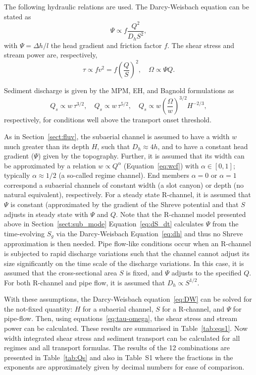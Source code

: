 \documentclass[esurf, manuscript]{copernicus}
\begin{document}
The following hydraulic relations are used.
The Darcy-Weisbach equation can be stated as
\begin{equation}
  \label{eq:DW}
  \Psi \propto f\frac{Q^2}{D_h S^2},
\end{equation}
with $\Psi = \Delta h / l$ the head gradient and friction factor $f$.
The shear stress and stream power are, respectively,
\begin{equation}
  \label{eq:tau-omega}
  \tau \propto f v^2 = f \left(\frac{Q}{S}\right)^2, \quad  \Omega \propto \Psi Q.
\end{equation}
% 

Sediment discharge is given by the MPM, EH, and Bagnold formulations as
\begin{equation}
  Q_s \propto w\, \tau^{3/2}, \quad Q_s \propto w\, \tau^{5/2}, \quad Q_s \propto w \left(\frac{\Omega}{w}\right)^{3/2} H^{-2/3},
\end{equation}
respectively, for conditions well above the transport onset threshold.

As in Section~\ref{sect:fluv}, the subaerial channel is assumed to have a width $w$ much greater than its depth $H$, such that $D_h\approx 4h$, and to have a constant head gradient ($\Psi$) given by the topography.
Further, it is assumed that its width can be approximated by a relation $w \propto Q^\alpha$ (Equation~\ref{eq:wcf}) with $\alpha\in [0,1]$; typically $\alpha \approx 1/2$ (a so-called regime channel).
End members $\alpha=0$ or $\alpha=1$ correspond a  subaerial channels of constant width (a slot canyon) or depth (no natural equivalent), respectively.
% 
For a steady state R-channel, it is assumed that  $\Psi$ is constant (approximated by the gradient of the Shreve \citeyear{shreve1972} potential and that $S$ adjusts in steady state with $\Psi$ and $Q$.
Note that the R-channel model presented above in Section~\ref{sect:sub_mode} Equation~\ref{eq:dS_dt} calculates $\Psi$ from the time-evolving $S_g$ via the Darcy-Weisbach Equation~\ref{eq:dh} and thus no Shreve approximation is then needed.
% 
Pipe flow-like conditions occur when an R-channel is subjected to rapid discharge variations such that the channel cannot adjust its size significantly on the time scale of the discharge variations.
In this case, it is assumed that the cross-sectional area $S$ is fixed, and $\Psi$ adjusts to the specified $Q$.
For both R-channel and pipe flow, it is assumed that $D_h \propto S^{1/2}$.

With these assumptions, the Darcy-Weisbach equation~\eqref{eq:DW} can be solved for the not-fixed quantity: $H$ for a subaerial channel, $S$ for a R-channel, and $\Psi$ for pipe-flow.
Then, using equations~\eqref{eq:tau-omega}, the shear stress and stream power can be calculated.
These results are summarised in Table~\ref{tab:eqs1}.
Now width integrated shear stress and sediment transport can be calculated for all regimes and all transport formulas.
The results of the 12 combinations are presented in Table~\ref{tab:Qs} and also in Table~S1 where the fractions in the exponents are approximately given by decimal numbers for ease of comparison.
\end{document}
